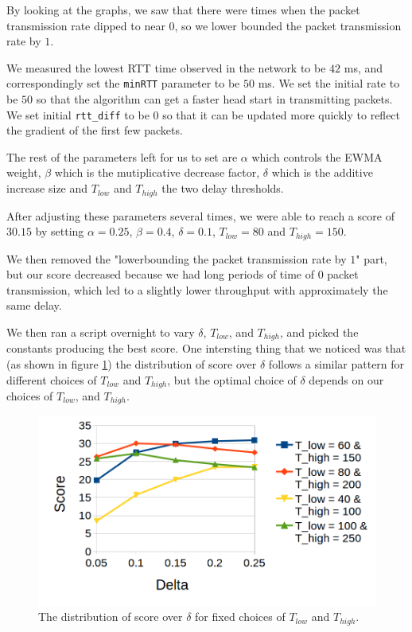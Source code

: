 \documentclass[11pt,a4paper]{article}
\begin{document}
By looking at the graphs, we saw that there were times when the packet transmission rate dipped to near $0$, so we lower
bounded the packet transmission rate by $1$.

We measured the lowest RTT time observed in the network to be $42$ ms, and
correspondingly set the
\texttt{minRTT} parameter to be $50$ ms. We set the initial rate to be $50$ so
that the algorithm can get a faster head start in transmitting packets. We set
initial \texttt{rtt\_diff} to be $0$ so that it can be updated more quickly to
reflect the gradient of the first few packets.

The rest of the parameters left for us to set are $\alpha$ which controls the
EWMA weight, $\beta$ which is the mutiplicative decrease factor, $\delta$ which
is the additive increase size and $T_{low}$ and $T_{high}$ the two delay
thresholds.

After adjusting these parameters several times, we were able to reach a score of
$30.15$ by setting $\alpha=0.25$, $\beta=0.4$, $\delta=0.1$, $T_{low}=80$ and
$T_{high}=150$.

We then removed the "lowerbounding the packet transmission rate by $1$" part, but
our score decreased because we had long periods of time of $0$ packet
transmission, which led to a slightly lower throughput with approximately the
same delay. 

We then ran a script overnight to vary $\delta$, $T_{low}$, and $T_{high}$, and
picked the constants producing the best score. One intersting thing that we
noticed was that (as shown in figure \ref{fig:cont1}) the distribution of score
over $\delta$ follows a similar pattern for different choices of $T_{low}$ and
$T_{high}$, but the optimal choice of $\delta$ depends on our choices of
$T_{low}$, and $T_{high}$.

\begin{figure}[h]
  \centering

  \includegraphics[scale=0.5]{contest1}
  \caption{The distribution of score over $\delta$ for fixed choices of
    $T_{low}$ and $T_{high}$. }
    \label{fig:cont1}
\end{figure}
\end{document}
